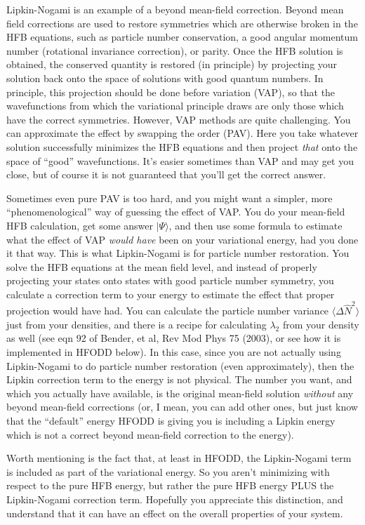 Lipkin-Nogami is an example of a beyond mean-field correction. Beyond mean field corrections are used to restore symmetries which are otherwise broken in the HFB equations, such as particle number conservation, a good angular momentum number (rotational invariance correction), or parity. Once the HFB solution is obtained, the conserved quantity is restored (in principle) by projecting your solution back onto the space of solutions with good quantum numbers. In principle, this projection should be done before variation (VAP), so that the wavefunctions from which the variational principle draws are only those which have the correct symmetries. However, VAP methods are quite challenging. You can approximate the effect by swapping the order (PAV). Here you take whatever solution successfully minimizes the HFB equations and then project \textit{that} onto the space of ``good'' wavefunctions. It's easier sometimes than VAP and may get you close, but of course it is not guaranteed that you'll get the correct answer.

Sometimes even pure PAV is too hard, and you might want a simpler, more ``phenomenological'' way of guessing the effect of VAP. You do your mean-field HFB calculation, get some answer $|\Psi\rangle$, and then use some formula to estimate what the effect of VAP \textit{would have} been on your variational energy, had you done it that way. This is what Lipkin-Nogami is for particle number restoration. You solve the HFB equations at the mean field level, and instead of properly projecting your states onto states with good particle number symmetry, you calculate a correction term to your energy to estimate the effect that proper projection would have had. You can calculate the particle number variance $\langle\Delta \hat{N}^2\rangle$ just from your densities, and there is a recipe for calculating $\lambda_2$ from your density as well (see eqn 92 of Bender, et al, Rev Mod Phys 75 (2003), or see how it is implemented in HFODD below). In this case, since you are not actually using Lipkin-Nogami to do particle number restoration (even approximately), then the Lipkin correction term to the energy is not physical. The number you want, and which you actually have available, is the original mean-field solution \textit{without} any beyond mean-field corrections (or, I mean, you can add other ones, but just know that the ``default'' energy HFODD is giving you is including a Lipkin energy which is not a correct beyond mean-field correction to the energy).

Worth mentioning is the fact that, at least in HFODD, the Lipkin-Nogami term is included as part of the variational energy. So you aren't minimizing with respect to the pure HFB energy, but rather the pure HFB energy PLUS the Lipkin-Nogami correction term. Hopefully you appreciate this distinction, and understand that it can have an effect on the overall properties of your system.

